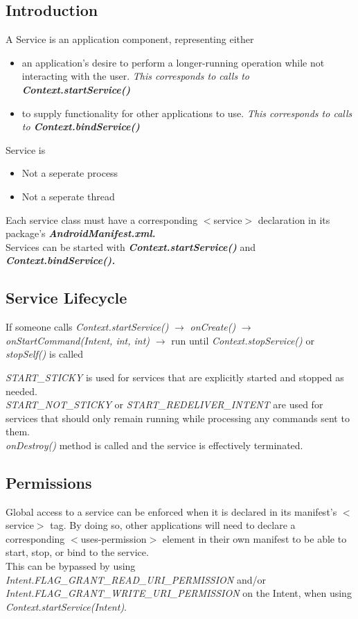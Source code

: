 \documentclass[12pt]{article}
\begin{document}
\subsection{Introduction}
A Service is an application component, representing either 
\begin{itemize}
\item{an application's desire to perform a longer-running operation while not interacting with the user. \textit{This corresponds to calls to \textbf{Context.startService()}}}
\item{to supply functionality for other applications to use. \textit{This corresponds to calls to \textbf{Context.bindService()}}}
\end{itemize} 
Service is 
\begin{itemize}
\item Not a seperate process
\item Not a seperate thread
\end{itemize}
Each service class must have a corresponding $<$service$>$ declaration in its package's \textit{\textbf{AndroidManifest.xml.}} \\
Services can be started with \textbf{\textit{Context.startService()}} and \textbf{\textit{Context.bindService().}}\\


\subsection{Service Lifecycle}
 If someone calls \textit{Context.startService()} $\longrightarrow$ \textit{onCreate()} $\longrightarrow$ \\ \textit{onStartCommand(Intent, int, int) } $\longrightarrow$  run until \textit{Context.stopService()} or \textit{stopSelf()} is called

\textit{START\_STICKY} is used for services that are explicitly started and stopped as needed. \\
\textit{START\_NOT\_STICKY} or \textit{START\_REDELIVER\_INTENT} are used for services that should only remain running while processing any commands sent to them.\\
\textit{onDestroy()} method is called and the service is effectively terminated.

\subsection{Permissions}
Global access to a service can be enforced when it is declared in its manifest's $<$service$>$ tag. 
By doing so, other applications will need to declare a corresponding $<$uses-permission$>$ element in their own manifest to be able to start, stop, or bind to the service.\\
This can be bypassed by using \textit{Intent.FLAG\_GRANT\_READ\_URI\_PERMISSION} and/or \textit{Intent.FLAG\_GRANT\_WRITE\_URI\_PERMISSION }on the Intent, when using \textit{Context.startService(Intent)}.
\pagebreak
\end{document}
